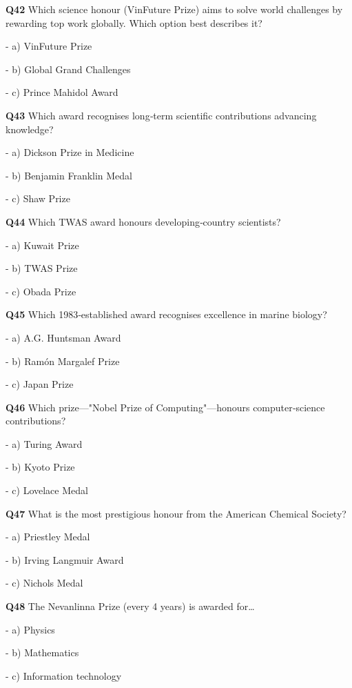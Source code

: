 \textbf{Q42} Which science honour (VinFuture Prize) aims to solve world challenges by rewarding top work globally. Which option best describes it?\par
\quad - a) VinFuture Prize\par
\quad - b) Global Grand Challenges\par
\quad - c) Prince Mahidol Award\par

\textbf{Q43} Which award recognises long‑term scientific contributions advancing knowledge?\par
\quad - a) Dickson Prize in Medicine\par
\quad - b) Benjamin Franklin Medal\par
\quad - c) Shaw Prize\par

\textbf{Q44} Which TWAS award honours developing‑country scientists?\par
\quad - a) Kuwait Prize\par
\quad - b) TWAS Prize\par
\quad - c) Obada Prize\par

\textbf{Q45} Which 1983‑established award recognises excellence in marine biology?\par
\quad - a) A.G. Huntsman Award\par
\quad - b) Ramón Margalef Prize\par
\quad - c) Japan Prize\par

\textbf{Q46} Which prize—"Nobel Prize of Computing"—honours computer‑science contributions?\par
\quad - a) Turing Award\par
\quad - b) Kyoto Prize\par
\quad - c) Lovelace Medal\par

\textbf{Q47} What is the most prestigious honour from the American Chemical Society?\par
\quad - a) Priestley Medal\par
\quad - b) Irving Langmuir Award\par
\quad - c) Nichols Medal\par

\textbf{Q48} The Nevanlinna Prize (every 4 years) is awarded for…\par
\quad - a) Physics\par
\quad - b) Mathematics\par
\quad - c) Information technology\par

